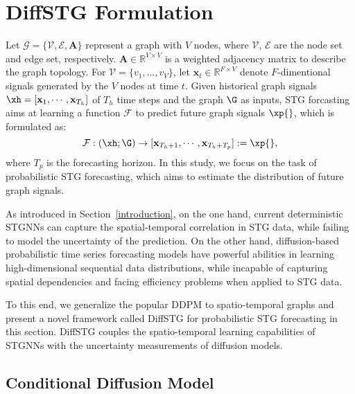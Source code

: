 {\section{DiffSTG Formulation} \label{sec:DiffSTG}

\par Let $\mathcal{G}=\{{\mathcal V}, {\mathcal E}, {\mathbf A} \}$ represent a graph with $V$ nodes, where $\mathcal V$,  $\mathcal E$ are the node set and edge set, respectively. ${\mathbf A} \in {\mathbb R}^{V \times V}$ is a weighted adjacency matrix to describe the graph topology. 
For ${\mathcal V}=\{ v_1, \dots, v_{V} \}$, let ${\mathbf x}_t \in {\mathbb R}^{ F \times V}$ denote $F$-dimentional signals generated by the $V$ nodes at time $t$. Given historical graph signals $\xh = [{\mathbf x_1}, \cdots, {\mathbf x}_{T_h}]$ of $T_h$  time steps and the graph $\G$ as inputs, STG forcasting aims at learning a function $\mathcal F$ to predict future graph signals $\xp{}$, which is formulated as:
\begin{equation}
    {\mathcal F}:(\xh; \G) \rightarrow [{\mathbf x_{T_h + 1}}, \cdots, {\mathbf x_{T_h + T_p}}]:=\xp{},
\end{equation}
where $T_p$ is the forecasting horizon. In this study, we focus on the task of probabilistic STG forecasting, which aims to estimate the distribution of future graph signals. 

\par As introduced in Section~\ref{introduction}, on the one hand, current deterministic STGNNs can capture the spatial-temporal correlation in STG data, while failing to model the uncertainty of the prediction. On the other hand, diffusion-based probabilistic time series forecasting models  \cite{rasul2021autoregressive, tashiro2021csdi} have powerful abilities in learning high-dimensional sequential data distributions, while incapable of capturing spatial dependencies and facing efficiency problems when applied to STG data. 

\par To this end, we generalize the popular DDPM to spatio-temporal graphs and present a novel framework called DiffSTG for probabilistic STG forecasting in this section. DiffSTG couples the spatio-temporal learning capabilities of STGNNs with the uncertainty measurements of diffusion models.
 

\subsection{Conditional Diffusion Model}

}
